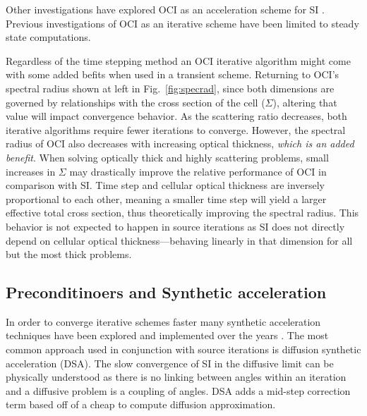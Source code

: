 Other investigations have explored OCI as an acceleration scheme for SI \cite{anistratov_iterative_2015, hoagland_hybrid_2021}. %
Previous investigations of OCI as an iterative scheme have been limited to steady state computations.

Regardless of the time stepping method an OCI iterative algorithm might come with some added befits when used in a transient scheme.
Returning to OCI's spectral radius shown at left in Fig.~\ref{fig:specrad}, since both dimensions are governed by relationships with the cross section of the cell ($\Sigma$), altering that value will impact convergence behavior. 
As the scattering ratio decreases, both iterative algorithms require fewer iterations to converge.
However, the spectral radius of OCI also decreases with increasing optical thickness, \textit{which is an added benefit}.
When solving optically thick and highly scattering problems, small increases in $\Sigma$ may drastically improve the relative performance of OCI in comparison with SI.
Time step and cellular optical thickness are inversely proportional to each other, meaning a smaller time step will yield a larger effective total cross section, thus theoretically improving the spectral radius.
This behavior is not expected to happen in source iterations as SI does not directly depend on cellular optical thickness---behaving linearly in that dimension for all but the most thick problems.

\subsection{Preconditinoers and Synthetic acceleration}

\label{sec:syn_acc}
In order to converge iterative schemes faster many synthetic acceleration techniques have been explored and implemented over the years \cite{adams_fast_2002}.
The most common approach used in conjunction with source iterations is diffusion synthetic acceleration (DSA)\cite{adams_fast_2002}.
The slow convergence of SI in the diffusive limit can be physically understood as there is no linking between angles within an iteration and a diffusive problem is a coupling of angles.
DSA adds a mid-step correction term based off of a cheap to compute diffusion approximation.


